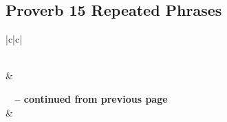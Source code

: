 \subsection{Proverb 15 Repeated Phrases}


\normalsize
 
\begin{center}
\begin{longtable}{|c|c|}
\caption[Proverb 15 Repeated Phrases]{Proverb 15 Repeated Phrases}\label{table:Repeated Phrases Proverb 15} \\
\hline {} &  \\ \hline 
\endfirsthead
 
{{\bfseries \tablename\ \thetable{} -- continued from previous page}} \\  
\hline {} &  \\ \hline 
\endhead
 

\end{longtable}
\end{center}

